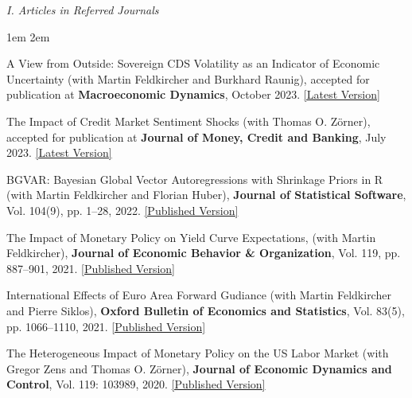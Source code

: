 \documentclass{resume} %
\begin{document}
{\large \itshape I. Articles in Referred Journals}
\vspace{0.1cm}
\begin{etaremune}
    \par \begingroup \leftskip1em \rightskip2em \vspace*{-0.2cm}
    \item A View from Outside: Sovereign CDS Volatility as an Indicator of Economic Uncertainty (with Martin Feldkircher and Burkhard Raunig), accepted for publication at \textbf{Macroeconomic Dynamics}, October 2023. \href{https://mboeck11.github.io/papers/BFR2023MD.pdf}{[Latest Version]}
    \item The Impact of Credit Market Sentiment Shocks (with Thomas O. Z\"{o}rner), accepted for publication at \textbf{Journal of Money, Credit and Banking}, July 2023. \href{https://mboeck11.github.io/papers/BZ2023JMCB.pdf}{[Latest Version]}
    \item BGVAR: Bayesian Global Vector Autoregressions with Shrinkage Priors in R (with Martin Feldkircher and Florian Huber), \textbf{Journal of Statistical Software}, Vol. 104(9), pp. 1--28, 2022. \href{https://doi.org/10.18637/jss.v104.i09}{[Published Version]}
    \item The Impact of Monetary Policy on Yield Curve Expectations, (with Martin Feldkircher), \textbf{Journal of Economic Behavior \& Organization}, Vol. 119, pp. 887--901, 2021. \href{https://doi.org/10.1016/j.jebo.2021.09.044}{[Published Version]}
    \item International Effects of Euro Area Forward Gudiance (with Martin Feldkircher and Pierre Siklos), \textbf{Oxford Bulletin of Economics and Statistics}, Vol. 83(5), pp. 1066--1110, 2021. \href{https://doi.org/10.1111/obes.12438}{[Published Version]}
    \item The Heterogeneous Impact of Monetary Policy on the US Labor Market (with Gregor Zens and Thomas O. Z\"{o}rner), \textbf{Journal of Economic Dynamics and Control}, Vol. 119: 103989, 2020. \href{https://doi.org/10.1016/j.jedc.2020.103989}{[Published Version]}
    \par \endgroup
\end{etaremune}
\end{document}

